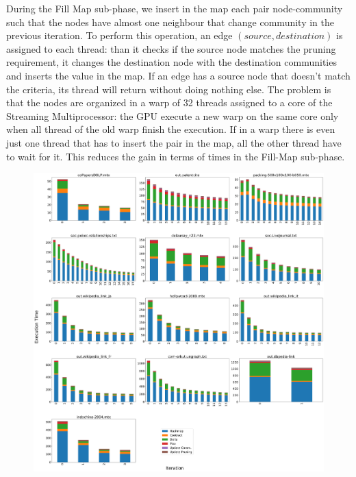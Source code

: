 During the Fill Map sub-phase, we insert in the map each pair node-community such that the nodes have almost one neighbour that change community in the previous iteration.
To perform this operation, an edge $(source, destination)$ is assigned to each thread: than it checks if the source node matches the pruning requirement, it changes the destination node with the destination communities and inserts the value in the map. If an edge has a source node that doesn't match the criteria, its thread will return without doing nothing else. The problem is that the nodes are organized in a warp of 32 threads assigned to a core of the Streaming Multiprocessor: the GPU execute a new warp on the same core only when all thread of the old warp finish the execution. If in a warp there is even just one thread that has to insert the pair in the map, all the other thread have to wait for it. This reduces the gain in terms of times in the Fill-Map sub-phase.
\begin{figure}[t!]
	\centering
	\includegraphics[width=1\linewidth]{0-resources/suphases-hash}
	\caption{}
	\label{fig:suphases-hash}
\end{figure}

